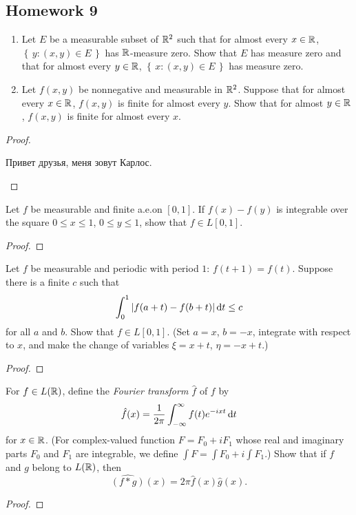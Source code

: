 \subsection{Homework 9}
\begin{problem}
\begin{enumerate}[label=(\alph*)]
\item Let $E$ be a measurable subset of $\mathbb{R}^2$ such that for almost every
  $x\in\mathbb{R}$, $\left\{\,y:(x,y)\in E\,\right\}$ has
  $\mathbb{R}$-measure zero. Show that $E$ has measure zero and that for almost
  every $y\in\mathbb{R}$, $\left\{\,x:(x,y)\in E\,\right\}$ has
  measure zero.
\item Let $f(x,y)$ be nonnegative and measurable in $\mathbb{R}^2$. Suppose that
  for almost every $x\in\mathbb{R}$, $f(x,y)$ is finite for almost every
  $y$. Show that for almost $y\in\mathbb{R}$, $f(x,y)$ is finite for almost
  every $x$.
\end{enumerate}
\end{problem}
\begin{proof}
\begin{russian}
Привет друзья, меня зовут Карлос.
\end{russian}
\end{proof}

\begin{problem}
Let $f$ be measurable and finite a.e.\@ on $[0,1]$. If $f(x)-f(y)$ is
integrable over the square $0\leq x\leq 1$, $0\leq y\leq 1$, show that
$f\in L[0,1]$.
\end{problem}
\begin{proof}
\end{proof}

\begin{problem}
Let $f$ be measurable and periodic with period $1$: $f(t+1)=f(t)$. Suppose
there is a finite $c$ such that
\[
\int_0^1|f(a+t)-f(b+t)|\mathop{}\!\mathrm{d} t\leq c
\]
for all $a$ and $b$. Show that $f\in L[0,1]$. (Set $a=x$, $b=-x$, integrate
with respect to $x$, and make the change of variables $\xi=x+t$,
$\eta=-x+t$.)
\end{problem}
\begin{proof}
\end{proof}

\begin{problem}
For $f\in L(\mathbb{R})$, define the \emph{Fourier transform $\hat f$} of $f$
by
\[
\hat f(x)=\frac{1}{2\pi}\int_{-\infty}^\infty f(t)e^{-ixt}\mathop{}\!\mathrm{d} t
\]
for $x\in\mathbb{R}$. (For complex-valued function $F=F_0+iF_1$ whose real and
imaginary parts $F_0$ and $F_1$ are integrable, we define $\int F=\int
F_0+i\int F_1$.) Show that if $f$ and $g$ belong to $L(\mathbb{R})$, then
\[
\widehat{(f*g)}(x)=2\pi\hat f(x)\hat g(x).
\]
\end{problem}
\begin{proof}
\end{proof}

